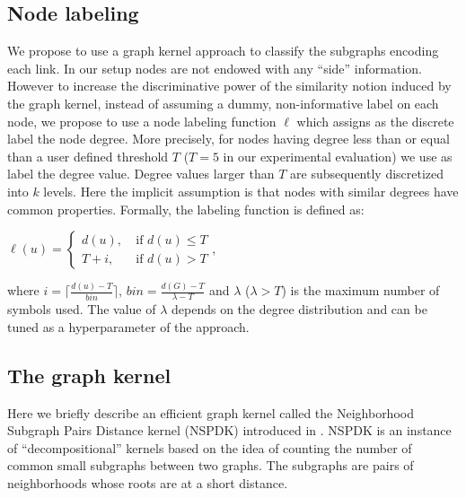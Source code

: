 \documentclass[runningheads,a4paper]{llncs}
\begin{document}
\subsection{Node labeling}
We propose to use a graph kernel approach to classify the subgraphs encoding each link. In our setup nodes are not endowed with any ``side'' information. However to increase the discriminative power of the similarity notion induced by the graph kernel, instead of assuming a dummy, non-informative label on each node, we propose to use a node labeling function $\ell$ which assigns as the discrete label the node degree. More precisely, for nodes having degree less than or equal than a user defined threshold $T$ ($T=5$ in our experimental evaluation) we use as label the degree value. Degree values larger than $T$ are subsequently discretized into $k$ levels. Here the implicit assumption is that nodes with similar degrees have common properties. Formally, the labeling function is defined as:
\begin{center}
$\ell(u) = \left\{
	\begin{array}{ll}
		d(u),\  & \mbox{if } d(u) \leq T \\
		T+i,\ & \mbox{if } d(u) > T
	\end{array}
\right.$,
\end{center}
where $i = \lceil \frac{d(u)-T}{bin}\rceil$, $bin = \frac{d(G)-T}{\lambda - T}$ and $\lambda$ ($\lambda > T$) is the maximum number of symbols used. The value of $\lambda$ depends on the degree distribution and can be tuned as a hyperparameter of the approach.



\subsection{The graph kernel}
Here we briefly describe an efficient graph kernel called the Neighborhood Subgraph Pairs Distance kernel (NSPDK) introduced in \cite{nspdk}. NSPDK is an instance of ``decompositional'' kernels \cite{convolution-kernel} based on the idea of counting the number of common small subgraphs between two graphs. The subgraphs are pairs of neighborhoods whose roots are at a short distance. 
\end{document}
